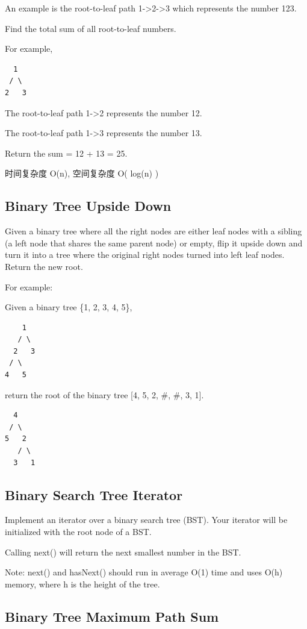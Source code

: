 \documentclass[12pt]{book}
\begin{document}
An example is the root-to-leaf path 1->2->3 which represents the number 123.

Find the total sum of all root-to-leaf numbers.

For example,
\lstset{language=java,label= ,caption= ,numbers=none}
\begin{lstlisting}
  1
 / \
2   3
\end{lstlisting}

The root-to-leaf path 1->2 represents the number 12.

The root-to-leaf path 1->3 represents the number 13.

Return the sum = 12 + 13 = 25.

时间复杂度 O(n), 空间复杂度 O( log(n) )


\subsection{Binary Tree Upside Down}
\label{sec-4-5-8}
Given a binary tree where all the right nodes are either leaf nodes with a sibling (a left node that shares the same parent node) or empty, flip it upside down and turn it into a tree where the original right nodes turned into left leaf nodes. Return the new root.

For example:

Given a binary tree \{1, 2, 3, 4, 5\},
\lstset{language=java,label= ,caption= ,numbers=none}
\begin{lstlisting}
    1
   / \
  2   3
 / \
4   5
\end{lstlisting}

return the root of the binary tree [4, 5, 2, \#, \#, 3, 1].
\lstset{language=java,label= ,caption= ,numbers=none}
\begin{lstlisting}
  4
 / \
5   2
   / \
  3   1
\end{lstlisting}

\subsection{Binary Search Tree Iterator}
\label{sec-4-5-9}
Implement an iterator over a binary search tree (BST). Your iterator will be initialized with the root node of a BST.

Calling next() will return the next smallest number in the BST.

Note: next() and hasNext() should run in average O(1) time and uses O(h) memory, where h is the height of the tree.

\subsection{Binary Tree Maximum Path Sum}
\label{sec-4-5-10}
\end{document}
